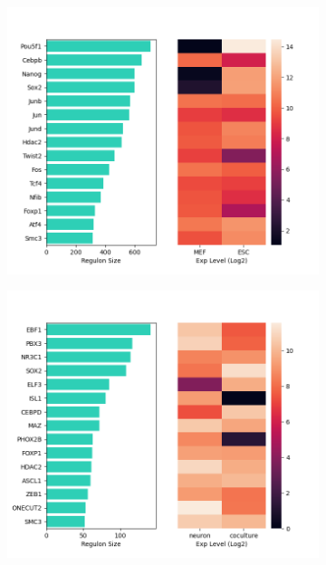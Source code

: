 \documentclass[fleqn,10pt]{wlscirep}
\begin{document}
  \begin{figure}
    \begin{subfigure}{0.49\linewidth}
      \centering
      \includegraphics[width=\linewidth, keepaspectratio,]{../images/MEF_ESC_top.png}
      \caption{}
    \end{subfigure}
    \begin{subfigure}{0.49\linewidth}
      \centering
      \includegraphics[width=\linewidth, keepaspectratio,]{../images/N_cocul_top.png}
      \caption{}
    \end{subfigure}


\end{figure}
\end{document}
